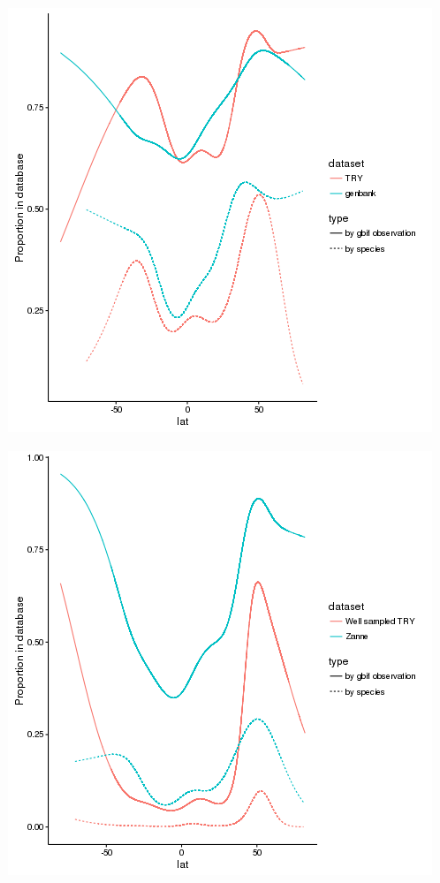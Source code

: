 \documentclass[a4paper,11pt]{article}
\begin{document}
\begin{figure}[h!]
\centering
  \includegraphics[width=\textwidth]{figures/multi_gam.png}
\end{figure}

\begin{figure}[h!]
\centering
  \includegraphics[width=\textwidth]{figures/multi_gam_zae_diaz.png}
\end{figure}
\end{document}
